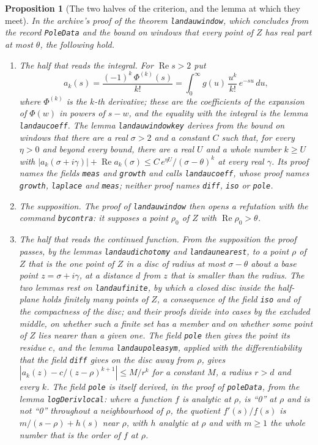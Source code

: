\documentclass[11pt]{article}
\newtheorem{proposition}[theorem]{Proposition}
\theoremstyle{definition}
\theoremstyle{remark}
\newcommand{\re}{\operatorname{Re}}
\DeclareRobustCommand{\lean}[1]{{\renewcommand{\_}{\textunderscore\allowbreak}\texttt{#1}}}
\begin{document}
\begin{proposition}[The two halves of the criterion, and the lemma at which they meet]\label{prop:junction}
In the archive's proof of the theorem \lean{landau\_window}, which concludes from the record \lean{PoleData} and the bound on windows that every point of $Z$ has real part at most $\theta$, the following hold.
\begin{enumerate}[leftmargin=2em,itemsep=1pt]\sloppy
\item \emph{The half that reads the integral.} For $\re s>2$ put
\[
a_k(s)=\frac{(-1)^k\,\Phi^{(k)}(s)}{k!}=\int_0^\infty g(u)\,\frac{u^{k}}{k!}\,e^{-su}\,du ,
\]
where $\Phi^{(k)}$ is the $k$-th derivative; these are the coefficients of the expansion of $\Phi(w)$ in powers of $s-w$, and the equality with the integral is the lemma \lean{landau\_coeff}. The lemma \lean{landau\_window\_key} derives from the bound on windows that there are a real $\sigma>2$ and a constant $C$ such that, for every $\eta>0$ and beyond every bound, there are a real $U$ and a whole number $k\ge U$ with $|a_k(\sigma+i\gamma)|+\re a_k(\sigma)\le C\,e^{\eta U}/(\sigma-\theta)^{k}$ at every real $\gamma$. Its proof names the fields \lean{meas} and \lean{growth} and calls \lean{landau\_coeff}, whose proof names \lean{growth}, \lean{laplace} and \lean{meas}; neither proof names \lean{diff}, \lean{iso} or \lean{pole}.
\item \emph{The supposition.} The proof of \lean{landau\_window} then opens a refutation with the command \lean{by\_contra}: it supposes a point $\rho_0$ of $Z$ with $\re\rho_0>\theta$.
\item \emph{The half that reads the continued function.} From the supposition the proof passes, by the lemmas \lean{landau\_dichotomy} and \lean{landau\_nearest}, to a point $\rho$ of $Z$ that is the one point of $Z$ in a disc of radius at most $\sigma-\theta$ about a base point $z=\sigma+i\gamma$, at a distance $d$ from $z$ that is smaller than the radius. The two lemmas rest on \lean{landau\_finite}, by which a closed disc inside the half-plane holds finitely many points of $Z$, a consequence of the field \lean{iso} and of the compactness of the disc; and their proofs divide into cases by the excluded middle, on whether such a finite set has a member and on whether some point of $Z$ lies nearer than a given one. The field \lean{pole} then gives the point its residue $c$, and the lemma \lean{landau\_pole\_asym}, applied with the differentiability that the field \lean{diff} gives on the disc away from $\rho$, gives $|a_k(z)-c/(z-\rho)^{k+1}|\le M/r^{k}$ for a constant $M$, a radius $r>d$ and every $k$. The field \lean{pole} is itself derived, in the proof of \lean{poleData}, from the lemma \lean{logDeriv\_local}: where a function $f$ is analytic at $\rho$, is ``0'' at $\rho$ and is not ``0'' throughout a neighbourhood of $\rho$, the quotient $f'(s)/f(s)$ is $m/(s-\rho)+h(s)$ near $\rho$, with $h$ analytic at $\rho$ and with $m\ge1$ the whole number that is the order of $f$ at $\rho$.

\end{enumerate}
\end{proposition}
\end{document}
